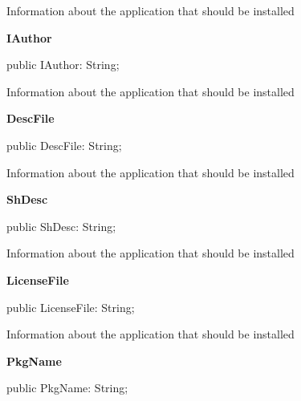 \documentclass{report}
\newif\ifpdf
\begin{document}
\begin{list}{}
\begin{flushleft}
\ifpdf
\end{flushleft}
\fi


\par Information about the application that should be installed\label{imainunit.TIWizFrm-IAuthor}
\item[\textbf{IAuthor}\hfill]
\ifpdf
\begin{flushleft}
\fi
\begin{ttfamily}
public IAuthor: String;\end{ttfamily}

\ifpdf
\end{flushleft}
\fi


\par Information about the application that should be installed\label{imainunit.TIWizFrm-DescFile}
\item[\textbf{DescFile}\hfill]
\ifpdf
\begin{flushleft}
\fi
\begin{ttfamily}
public DescFile: String;\end{ttfamily}

\ifpdf
\end{flushleft}
\fi


\par Information about the application that should be installed\label{imainunit.TIWizFrm-ShDesc}
\item[\textbf{ShDesc}\hfill]
\ifpdf
\begin{flushleft}
\fi
\begin{ttfamily}
public ShDesc: String;\end{ttfamily}

\ifpdf
\end{flushleft}
\fi


\par Information about the application that should be installed\label{imainunit.TIWizFrm-LicenseFile}
\item[\textbf{LicenseFile}\hfill]
\ifpdf
\begin{flushleft}
\fi
\begin{ttfamily}
public LicenseFile: String;\end{ttfamily}

\ifpdf
\end{flushleft}
\fi


\par Information about the application that should be installed\label{imainunit.TIWizFrm-PkgName}
\item[\textbf{PkgName}\hfill]
\ifpdf
\begin{flushleft}
\fi
\begin{ttfamily}
public PkgName: String;\end{ttfamily}


\end{flushleft}
\end{list}
\end{document}
